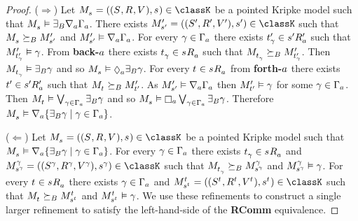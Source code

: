 \begin{proof}
($\Rightarrow$) Let $\kPModelAndTuple{\kStateS} \in \classK$ be a pointed Kripke model such that $\kPModel{\kStateS} \entails \somerefsBs \coversA \Gamma_\agentA$.
There exists $\kPModelAndTupleP{\kStateSP} \in \classK$ such that $\kPModel{\kStateS} \simulatesBs \kPModelP{\kStateSP}$ and $\kPModelP{\kStateSP} \entails \coversA \Gamma_\agentA$.
For every $\gamma \in \Gamma_\agentA$ there exists $\kStateTP_\gamma \in \kSuccessorsPA{\kStateSP}$ such that $\kPModelP{\kStateTP_\gamma} \entails \gamma$.
From {\bf back-$\agentA$} there exists $\kStateT_\gamma \in \kSuccessorsA{\kStateS}$ such that $\kPModel{\kStateT_\gamma} \simulatesBs \kPModelP{\kStateTP_\gamma}$.
Then $\kPModel{\kStateT_\gamma} \entails \somerefsBs \gamma$ and so $\kPModel{\kStateS} \entails \possibleA \somerefsBs \gamma$.
For every $\kStateT \in \kSuccessorsA{\kStateS}$ from {\bf forth-$\agentA$} there exists $\kStateTP \in \kSuccessorsPA{\kStateSP}$ such that $\kPModel{\kStateT} \simulatesBs \kPModelP{\kStateTP}$.
As $\kPModelP{\kStateSP} \entails \coversA \Gamma_\agentA$ then $\kPModelP{\kStateTP} \entails \gamma$ for some $\gamma \in \Gamma_\agentA$.
Then $\kPModel{\kStateT} \entails \bigvee_{\gamma \in \Gamma_\agentA} \somerefsBs \gamma$ and so $\kPModel{\kStateS} \entails \necessaryA \bigvee_{\gamma \in \Gamma_\agentA} \somerefsBs \gamma$.
Therefore $\kPModel{\kStateS} \entails \coversA \{\somerefsBs \gamma \mid \gamma \in \Gamma_\agentA\}$.

($\Leftarrow$) Let $\kPModelAndTuple{\kStateS} \in \classK$ be a pointed Kripke model such that $\kPModel{\kStateS} \entails \coversA \{\somerefsBs \gamma \mid \gamma \in \Gamma_\agentA\}$.
For every $\gamma \in \Gamma_\agentA$ there exists $\kStateT_\gamma \in \kSuccessorsA{\kStateS}$ and $\kPModelAndTuple[\gamma]{\kStateS[\gamma]} \in \classK$ such that $\kPModel{\kStateT_\gamma} \simulatesBs \kPModel[\gamma]{\kStateS[\gamma]}$ and $\kPModel[\gamma]{\kStateS[\gamma]} \entails \gamma$.
For every $\kStateT \in \kSuccessorsA{\kStateS}$ there exists $\gamma \in \Gamma_\agentA$ and $\kPModelAndTuple[\kStateT]{\kStateS[\kStateT]} \in \classK$ such that $\kPModel{\kStateT} \simulatesBs \kPModel[\kStateT]{\kStateS[\kStateT]}$ and $\kPModel[\kStateT]{\kStateS[\kStateT]} \entails \gamma$.
We use these refinements to construct a single larger refinement to satisfy the left-hand-side of the {\bf RComm} equivalence.


\end{proof}
